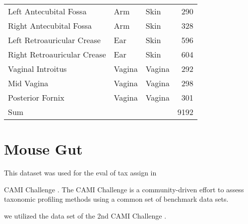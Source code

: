 \begin{table}[htb]
{\begin{center}
\begin{tabular}{lllr}
        Left Antecubital Fossa          & Arm               & Skin              & 290   \\
        Right Antecubital Fossa         & Arm               & Skin              & 328   \\
        Left Retroauricular Crease      & Ear               & Skin              & 596   \\
        Right Retroauricular Crease     & Ear               & Skin              & 604   \\
        Vaginal Introitus               & Vagina            & Vagina            & 292   \\
        Mid Vagina                      & Vagina            & Vagina            & 298   \\
        Posterior Fornix                & Vagina            & Vagina            & 301   \\
        Sum                             &                   &                   & 9192  \\
        \bottomrule
    \end{tabular}
    \end{center}
}
\end{table}


\section{Mouse Gut}
\label{supp:sec:DetailsEmpiricalDatasets:sub:MouseGut}

This dataset was used for the eval of tax assign in 

CAMI Challenge \citep{Sczyrba2017}.
The CAMI Challenge is a community-driven effort to assess taxonomic profiling methods
using a common set of benchmark data sets.


we utilized the  data set of the 2nd CAMI Challenge \citep{Bremges2018}.


